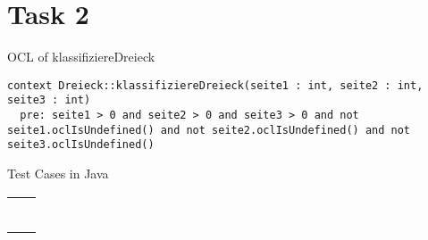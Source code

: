 \chapter{Task 2}
\begin{parlist}
 \item OCL of klassifiziereDreieck
 \begin{lstlisting}[language=OCL,frame=trBL]
context Dreieck::klassifiziereDreieck(seite1 : int, seite2 : int, seite3 : int) 
  pre: seite1 > 0 and seite2 > 0 and seite3 > 0 and not seite1.oclIsUndefined() and not seite2.oclIsUndefined() and not seite3.oclIsUndefined()
\end{lstlisting}
\item Test Cases in Java

\begin{center}
\begin{tabular}{ | c | c | } 
  \hline
  \begin{lstlisting}[language=java,frame=trBL]


\end{lstlisting}
\end{tabular}
\end{center}
\end{parlist}
